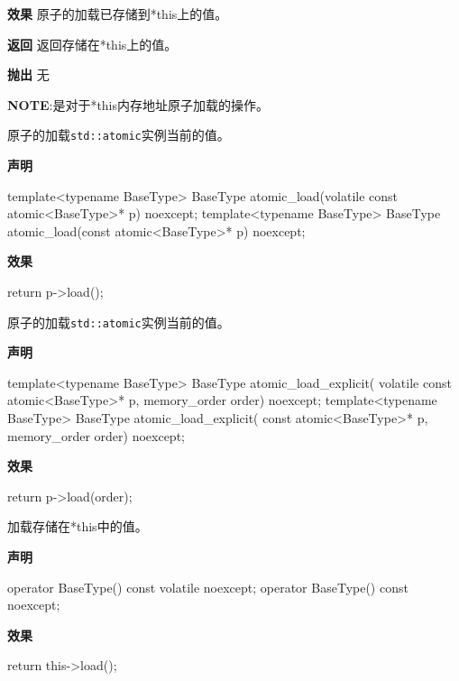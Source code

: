 \textbf{效果}
原子的加载已存储到*this上的值。

\textbf{返回}
返回存储在*this上的值。

\textbf{抛出}
无

\textbf{NOTE}:是对于*this内存地址原子加载的操作。


原子的加载\texttt{std::atomic}实例当前的值。

\textbf{声明}

\begin{cpp}
template<typename BaseType>
BaseType atomic_load(volatile const atomic<BaseType>* p) noexcept;
template<typename BaseType>
BaseType atomic_load(const atomic<BaseType>* p) noexcept;
\end{cpp}

\textbf{效果}

\begin{cpp}
return p->load();
\end{cpp}


原子的加载\texttt{std::atomic}实例当前的值。

\textbf{声明}

\begin{cpp}
template<typename BaseType>
BaseType atomic_load_explicit(
    volatile const atomic<BaseType>* p, memory_order order) noexcept;
template<typename BaseType>
BaseType atomic_load_explicit(
    const atomic<BaseType>* p, memory_order order) noexcept;
\end{cpp}

\textbf{效果}

\begin{cpp}
return p->load(order);
\end{cpp}


加载存储在*this中的值。

\textbf{声明}

\begin{cpp}
operator BaseType() const volatile noexcept;
operator BaseType() const noexcept;
\end{cpp}

\textbf{效果}

\begin{cpp}
return this->load();
\end{cpp}


